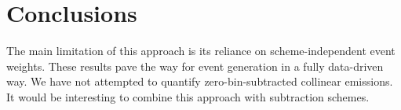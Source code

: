 \section{Conclusions}\label{sec:conclusions}

The main limitation of this approach is its reliance on
scheme-independent event weights. These results pave the way for event
generation in a fully data-driven way. We have not attempted to quantify
zero-bin-subtracted collinear emissions. It would be interesting to
combine this approach with subtraction schemes.


